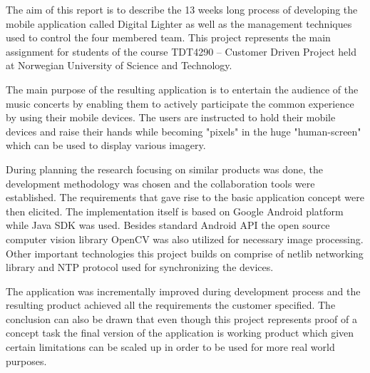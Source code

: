 The aim of this report is to describe the 13 weeks long process of developing the mobile application called Digital Lighter as well as the management techniques used to control the four membered team. This project represents the main assignment for students of the course TDT4290 -- Customer Driven Project held at Norwegian University of Science and Technology. 

The main purpose of the resulting application is to entertain the audience of the music concerts by enabling them to actively participate the common experience by using their mobile devices. The users are instructed to hold their mobile devices and raise their hands while becoming "pixels" in the huge "human-screen" which can be used to display various imagery.

During planning the research focusing on similar products was done, the development methodology was chosen and the collaboration tools were established. The requirements that gave rise to the basic application concept were then elicited. The implementation itself is based on Google Android platform while Java SDK was used. Besides standard Android API the open source computer vision library OpenCV was also utilized for necessary image processing. Other important technologies this project builds on comprise of netlib networking library and NTP protocol used for synchronizing the devices.

The application was incrementally improved during development process and the resulting product achieved all the requirements the customer specified. The conclusion can also be drawn that even though this project represents proof of a concept task the final version of the application is working product which given certain limitations can be scaled up in order to be used for more real world purposes.